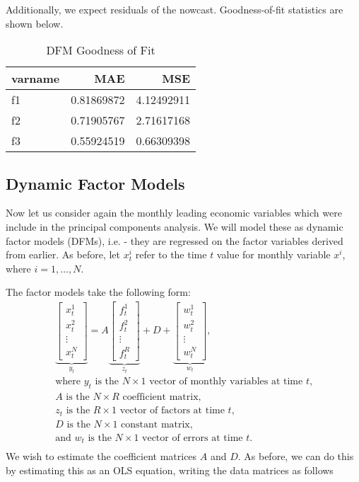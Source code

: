 \documentclass[11pt, letterpaper]{article}\usepackage[]{graphicx}\usepackage[]{color}
\begin{document}
Additionally, we expect residuals of the nowcast. Goodness-of-fit statistics are shown below.
\begin{table}[H]
\centering
\begingroup\footnotesize
\begin{tabular}{lrr}
  \hline
varname & MAE & MSE \\ 
  \hline
f1 & 0.81869872 & 4.12492911 \\ 
  f2 & 0.71905767 & 2.71617168 \\ 
  f3 & 0.55924519 & 0.66309398 \\ 
   \hline
\end{tabular}
\endgroup
\caption{DFM Goodness of Fit} 
\end{table}




\subsection{Dynamic Factor Models}
Now let us consider again the monthly leading economic variables which were include in the principal components analysis. We will model these as dynamic factor models (DFMs), i.e. - they are regressed on the factor variables derived from earlier. As before, let $x^i_t$ refer to the time $t$ value for monthly variable $x^i$, where $i = 1, \dots, N$.

The factor models take the following form:
\begin{align*}
\underbrace{\begin{bmatrix}
	x^1_t\\
	x^2_t\\
	\vdots \\
	x^N_t
\end{bmatrix}}_{y_t}
=
A
\underbrace{\begin{bmatrix}
	f^1_{t}\\
	f^2_{t}\\
	\vdots \\
	f^R_{t}
\end{bmatrix}}_{z_t}
+
D 
+
\underbrace{\begin{bmatrix}
	w^1_t\\
	w^2_t\\
	\vdots\\
	w^N_t
\end{bmatrix}}_{w_t},\\
\text{where $y_t$ is the $N \times 1$ vector of monthly variables at time $t$,}\\
\text{$A$ is the $N \times R$ coefficient matrix,}\\
\text{$z_t$ is the $R \times 1$ vector of factors at time $t$,}\\
\text{$D$ is the $N \times 1$ constant matrix,}\\
\text{and $w_t$ is the $N \times 1$ vector of errors at time $t$.}\\
\end{align*}
We wish to estimate the coefficient matrices $A$ and $D$. As before, we can do this by estimating this as an OLS equation, writing the data matrices as follows
\end{document}
